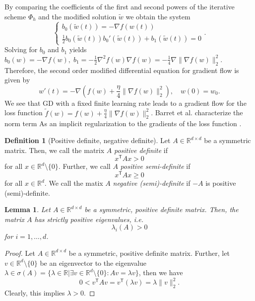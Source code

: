 \documentclass[12pt]{article}
\newtheorem{lemma}[lemma]{Lemma}
\theoremstyle{definition}
\newtheorem{definition}[definition]{Definition}
\numberwithin{equation}{section}
\newcommand{\R}{\mathbb{R}}
\newcommand{\T}{\mathsf{T}}
\newcommand{\norm}[1]{\lVert{#1}\rVert_2}
\begin{document}
By comparing the coefficients of the first and second powers of the iterative scheme $\Phi_h$ and the modified solution $\widetilde{w}$ we obtain the system
\begin{equation*}
  \begin{cases}
    b_0(\widetilde{w}(t)) = - \nabla f(w(t)) \\
    \frac{1}{2}b_0(\widetilde{w}(t))b_0'(\widetilde{w}(t)) + b_1(\widetilde{w}(t)) = 0
  \end{cases}.
\end{equation*}
Solving for $b_0$ and $b_1$ yields $b_0(w) = -\nabla f(w), \; b_1 = - \frac{1}{2}\nabla^2f(w)\nabla f(w) = -\frac{1}{4}\nabla\norm{\nabla f(w)}^2$. Therefore, the second order modified differential equation for gradient flow is given by
\begin{equation}
  \label{eq:second_order_ode}
  w'(t) = -\nabla(f(w) + \frac{\eta}{4}\norm{\nabla f(w)}^2),\quad w(0) = w_0.
\end{equation}
We see that GD with a fixed finite learning rate leads to a gradient flow for the loss function $\widetilde{f}(w) = f(w) + \frac{\eta}{4}\norm{\nabla f(w)}^2$. Barret et al. characterize the norm term As an implicit regularization to the gradients of the loss function \cite{barrettImplicitGradientRegularization2021}.
\begin{definition}[Positive definite, negative definite]
  Let $A \in \R^{d \times d}$ be a symmetric matrix. Then, we call the matrix $A$ \emph{positive definite} if
  \begin{equation*}
    x^\T A x > 0
  \end{equation*}
  for all $x \in \R^d \setminus \{0\}$. Further, we call $A$ \emph{positive semi-definite} if
  \begin{equation*}
    x^\T A x \geq 0
  \end{equation*}
  for all $x \in \R^d$. We call the matix $A$ \emph{negative (semi)-definite} if $-A$ is positive (semi)-definite.
\end{definition}
\begin{lemma}
  Let $A \in \R^{d \times d}$ be a symmetric, positive definite matrix. Then, the matrix $A$ has strictly positive eigenvalues, i.e.
  \begin{equation*}
    \lambda_i(A) > 0
  \end{equation*}
  for $i = 1, \dots, d$.
\end{lemma}
\begin{proof}
  Let $A \in \R^{d \times d}$ be a symmetric, positive definite matrix. Further, let $v \in \R^d \setminus \{0\}$ be an eigenvector to the eigenvalue $\lambda \in \sigma(A) = \{\lambda \in \R | \exists v \in \R^d \setminus \{0\}: Av = \lambda v \}$, then we have
  \begin{equation*}
    0 < v^\T A v = v^\T (\lambda v) = \lambda \norm{v}^2.
  \end{equation*}
  Clearly, this implies $\lambda > 0$.
\end{proof}
\end{document}
